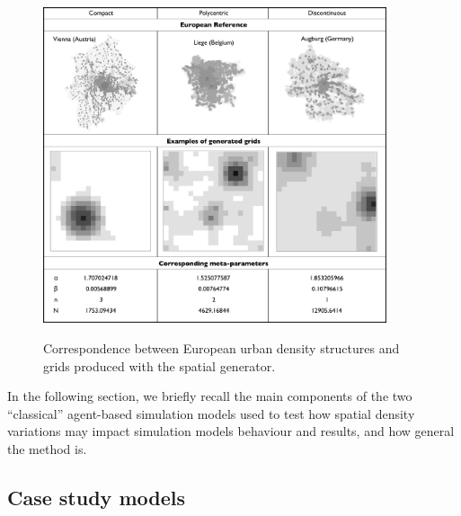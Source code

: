 \documentclass{JASSS}
\begin{document}
\begin{figure}[!t]
\centering
	\includegraphics[width=0.9\textwidth]{figures/Fig3.png}
 \caption{Correspondence between European urban density structures and grids produced with the spatial generator.}
  
\label{fig:densityTypes}
\end{figure} %


In the following section, we briefly recall the main components of the two ``classical'' agent-based simulation models used to test how spatial density variations may impact simulation models behaviour and results, and how general the method is.

\subsection{Case study models}
\end{document}
